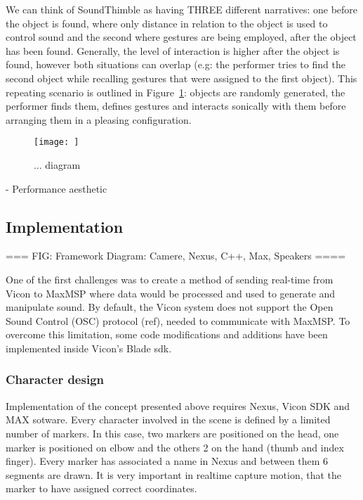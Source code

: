 \documentclass{nime-alternate}
\begin{document}
We can think of SoundThimble as having THREE different narratives: one before the object is found, where only distance in relation to the object is used to control sound and the second where gestures are being employed, after the object has been found. 
Generally, the level of interaction is higher after the object is found, however both situations can overlap (e.g: the performer tries to find the second object while recalling gestures that were assigned to the first object). This repeating scenario is outlined in Figure~\ref{fig:concept}: objects are randomly generated, the performer finds them, defines gestures and interacts sonically with them before arranging them in a pleasing configuration.


\begin{figure}[htbp]
	\centering
	\texttt{[image: ]}
	\caption{... diagram}
	\label{fig:concept}
\end{figure}

- Performance aesthetic\\

\subsection{Implementation}

=== FIG: Framework Diagram: Camere, Nexus, C++, Max, Speakers ====

One of the first challenges was to create a method of sending real-time from Vicon to MaxMSP where data would be processed and used to generate and manipulate sound. By default, the Vicon system does not support the Open Sound Control (OSC) protocol (ref), needed to communicate with MaxMSP. To overcome this limitation, some code modifications and additions have been implemented inside Vicon’s Blade sdk.


\subsubsection{Character design}

Implementation of the concept presented above requires Nexus, Vicon SDK and MAX sotware. Every character involved in the scene is defined by a limited number of markers. In this case, two markers are positioned on the head, one marker is positioned on elbow and the others 2 on the hand (thumb and index finger). Every marker has associated a name in Nexus and between them 6 segments are drawn. It is very important in realtime capture motion, that the marker to have assigned correct coordinates.
\end{document}
